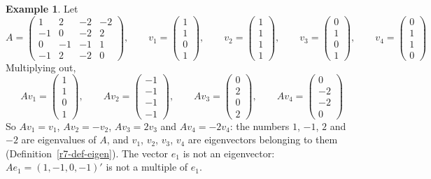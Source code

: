 \documentclass[12pt]{article}
\theoremstyle{definition}
\newtheorem{example}[theorem]{Example}
\begin{document}
\begin{example}\label{r7-exm-two}
Let
\[
A=\begin{pmatrix}1&2&-2&-2\\-1&0&-2&2\\0&-1&-1&1\\-1&2&-2&0\end{pmatrix},\qquad
v_1=\begin{pmatrix}1\\1\\0\\1\end{pmatrix},\qquad v_2=\begin{pmatrix}1\\1\\1\\1\end{pmatrix},\qquad
v_3=\begin{pmatrix}0\\1\\0\\1\end{pmatrix},\qquad v_4=\begin{pmatrix}0\\1\\1\\0\end{pmatrix}
\]
Multiplying out,
\[
Av_1=\begin{pmatrix}1\\1\\0\\1\end{pmatrix},\qquad Av_2=\begin{pmatrix}-1\\-1\\-1\\-1\end{pmatrix},\qquad
Av_3=\begin{pmatrix}0\\2\\0\\2\end{pmatrix},\qquad Av_4=\begin{pmatrix}0\\-2\\-2\\0\end{pmatrix}
\]
So \(Av_1=v_1\), \(Av_2=-v_2\), \(Av_3=2v_3\) and \(Av_4=-2v_4\): the numbers \(1\), \(-1\), \(2\) and \(-2\) are
eigenvalues of \(A\), and \(v_1\), \(v_2\), \(v_3\), \(v_4\) are eigenvectors belonging to them
(Definition~\ref{r7-def-eigen}). The vector \(e_1\) is not an eigenvector: \(Ae_1=(1,-1,0,-1)'\) is not a multiple of
\(e_1\).
\end{example}
\end{document}
